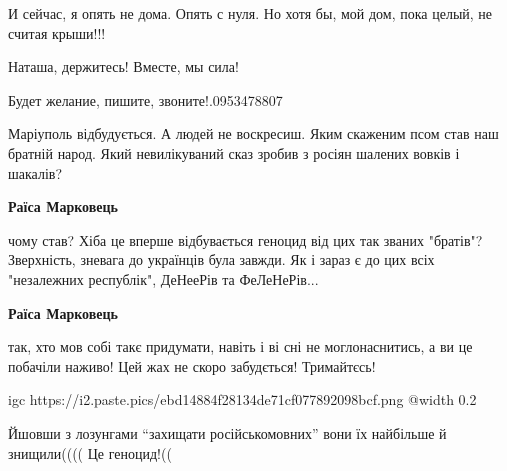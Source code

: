 И сейчас, я опять не дома. Опять с нуля. Но хотя бы, мой дом, пока целый, не
считая крыши!!!

Наташа, держитесь! Вместе, мы сила!

Будет желание, пишите, звоните!.0953478807


Маріуполь відбудується. А людей не воскресиш. Яким скаженим псом став наш
братній народ. Який невилікуваний сказ зробив з росіян шалених вовків і
шакалів?

\begin{itemize} %
\textbf{Раїса Марковець} 

чому став? Хіба це вперше відбувається геноцид від цих так званих "братів"?
Зверхність, зневага до українців була завжди. Як і зараз є до цих всіх
"незалежних республік", ДеНееРів та ФеЛеНеРів...

\textbf{Раїса Марковець} 

так, хто мов собі такє придумати, навіть і ві сні не моглонаснитись, а ви це
побачіли наживо! Цей жах не скоро забудється! Тримайтєсь!

\end{itemize} %


\ifcmt
  igc https://i2.paste.pics/ebd14884f28134de71cf077892098bcf.png
	@width 0.2
\fi


Йшовши з лозунгами \enquote{захищати російськомовних} вони їх найбільше й
знищили(((( Це геноцид!((
